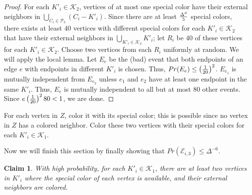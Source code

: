 \documentclass[12pt]{article}
\newtheorem{claim}[theorem]{Claim}
\theoremstyle{definition}
\begin{document}
\begin{proof}
For each $K'_i\in \mathcal{K}_2$, vertices of at most one special color have their external neighbors in $\bigcup_{C_i\in \mathcal{P}_3}(C_i-K'_i)$. 
Since there are at least $\Delta^d\over 5$ special colors, there exists at least $40$ vertices with different special colors for each $K'_i\in \mathcal{K}_2$ that have their external neighbors in $\bigcup_{K'_i\in \mathcal{K}_2}K'_i$; 
let $R_i$ be $40$ of these vertices for each $K'_i\in \mathcal{K}_2$.
Choose two vertices from each $R_i$ uniformly at random. 
We will apply the local lemma. 
Let $E_e$ be the (bad) event that both endpoints of an edge $e$ with endpoints in different $K'_i$ is chosen. 
Thus, $Pr(E_e)\leq \left({1\over 20}\right)^2$. $E_{e_1}$ is mutually independent from $E_{e_2}$ unless $e_1$ and $e_2$ have at least one endpoint in the same $K'_i$.
Thus, $E_e$ is mutually independent to all but at most $80$ other events. 
Since $e\left(1\over 20\right)^2 80<1$, we are done.
\hfill
\end{proof}

For each vertex in $Z$, color it with its special color; this is possible since no vertex in $Z$ has a colored neighbor. Color these two vertices with their special colors for each $K'_i\in \mathcal{K}_1$. 

Now we will finish this section by finally showing that $Pr(\mathcal{E}_{i,3})\leq \Delta^{-6}$.

\begin{claim}\label{3claim2}
With high probability, for each $K'_i\in \mathcal{K}_1$, there are at least two vertices in $K'_i$ where the special color of each vertex is available, and their external neighbors are colored. 
\end{claim}
\end{document}
